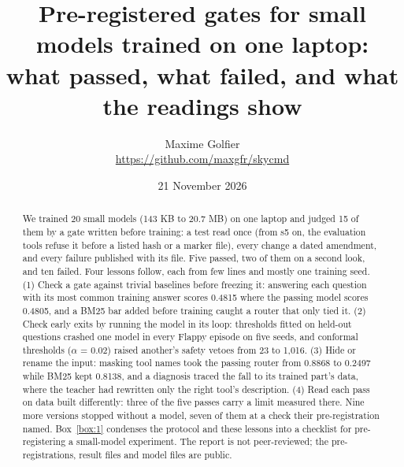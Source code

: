 \documentclass[10pt]{article}
\title{Pre-registered gates for small models trained on one laptop:\\
what passed, what failed, and what the readings show}
\author{Maxime Golfier\\[2pt]
\normalsize\url{https://github.com/maxgfr/skycmd}}
\date{21 November 2026}
\begin{document}
\maketitle



\begin{abstract}
\noindent We trained 20 small models (143 KB to 20.7 MB) on one laptop and judged 15 of them by a gate written before training: a test read once (from s5 on, the evaluation tools refuse it before a listed hash or a marker file), every change a dated amendment, and every failure published with its file. Five passed, two of them on a second look, and ten failed. Four lessons follow, each from few lines and mostly one training seed. (1) Check a gate against trivial baselines before freezing it: answering each question with its most common training answer scores 0.4815 where the passing model scores 0.4805, and a BM25 bar added before training caught a router that only tied it. (2) Check early exits by running the model in its loop: thresholds fitted on held-out questions crashed one model in every Flappy episode on five seeds, and conformal thresholds ($\alpha$ = 0.02) raised another's safety vetoes from 23 to 1,016. (3) Hide or rename the input: masking tool names took the passing router from 0.8868 to 0.2497 while BM25 kept 0.8138, and a diagnosis traced the fall to its trained part's data, where the teacher had rewritten only the right tool's description. (4) Read each pass on data built differently: three of the five passes carry a limit measured there. Nine more versions stopped without a model, seven of them at a check their pre-registration named. Box~\ref{box:1} condenses the protocol and these lessons into a checklist for pre-registering a small-model experiment. The report is not peer-reviewed; the pre-registrations, result files and model files are public.
\end{abstract}

\begin{center}
\end{center}
\end{document}
